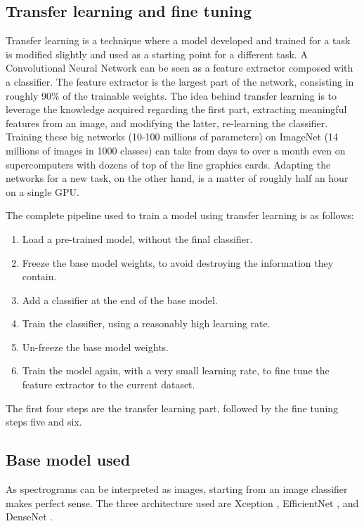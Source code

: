 \subsection{Transfer learning and fine tuning}

Transfer learning is a technique where a model developed and trained for a task
is modified slightly and used as a starting point for a different task.
A Convolutional Neural Network can be seen as a feature extractor composed with
a classifier.
The feature extractor is the largest part of the network, consisting in roughly
90\% of the trainable weights.
The idea behind transfer learning is to leverage the knowledge acquired
regarding the first part, extracting meaningful features from an image, and
modifying the latter, re-learning the classifier.
Training these big networks (10-100 millions of parameters) on ImageNet (14
millions of images in 1000 classes) can take from days to over a month even on
supercomputers with dozens of top of the line graphics cards.
Adapting the networks for a new task, on the other hand, is a matter of roughly
half an hour on a single GPU.

The complete pipeline used to train a model using transfer learning is as
follows:
\begin{enumerate}
    \item Load a pre-trained model, without the final classifier.
    \item Freeze the base model weights, to avoid destroying the information they
        contain.
    \item Add a classifier at the end of the base model.
    \item Train the classifier, using a reasonably high learning rate.
    \item Un-freeze the base model weights.
    \item Train the model again, with a very small learning rate, to fine tune
        the feature extractor to the current dataset.
\end{enumerate}

The first four steps are the transfer learning part, followed by the fine
tuning steps five and six.

\subsection{Base model used}

As spectrograms can be interpreted as images, starting from an image classifier
makes perfect sense. The three architecture used are
Xception 
\cite{chollet2017xception},
EfficientNet
\cite{tan2020efficientnet},
and
DenseNet
\cite{huang2018densely}.

